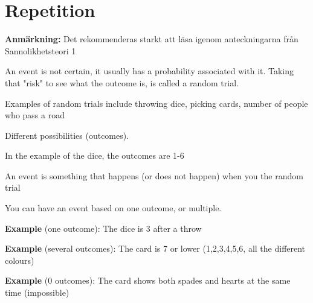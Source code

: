 \section{Repetition}
\par\bigskip
\noindent\textbf{Anmärkning:} Det rekommenderas starkt att läsa igenom anteckningarna från Sannolikhetsteori 1
\par\bigskip
\begin{theo}{}
  An event is not certain, it usually has a probability associated with it. Taking that "risk" to see what the outcome is, is called a random trial.
  \par\bigskip
  \noindent Examples of random trials include throwing dice, picking cards, number of people who pass a road
\end{theo}
\par\bigskip
\noindent Different possibilities (outcomes).\par
\noindent In the example of the dice, the outcomes are 1-6
\par\bigskip
\begin{theo}[Events]{}
  An event is something that happens (or does not happen) when you the random trial 
\end{theo}
\par\bigskip
\noindent You can have an event based on one outcome, or multiple.  
\par\bigskip
\noindent\textbf{Example} (one outcome): The dice is 3 after a throw
\par\bigskip
\noindent\textbf{Example} (several outcomes): The card is 7 or lower (1,2,3,4,5,6, all the different colours)
\par\bigskip
\noindent\textbf{Example} (0 outcomes): The card shows both spades and hearts at the same time (impossible)
\par\bigskip
